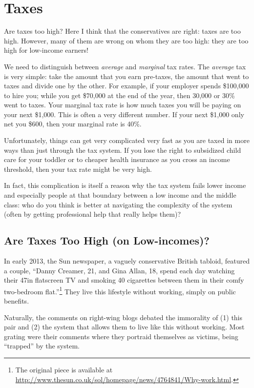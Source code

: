 \chapter{Taxes}%
\label{chpt:taxes}

Are taxes too high? Here I think that the conservatives are right: taxes are
too high. However, many of them are wrong on whom they are too high: they are
too high for low-income earners!

We need to distinguish between \emph{average} and \emph{marginal} tax rates.
The \emph{average} tax is very simple: take the amount that you earn pre-taxes,
the amount that went to taxes and divide one by the other. For example, if your
employer spends \$100,000 to hire you; while you get \$70,000 at the end of the
year, then 30,000 or 30\% went to taxes. Your marginal tax rate is how much
taxes you will be paying on your next \$1,000. This is often a very different
number. If your next \$1,000 only net you \$600, then your marginal rate is
40\%. %

Unfortunately, things can get very complicated very fast as you are taxed in
more ways than just through the tax system. If you lose the right to subsidized
child care for your toddler or to cheaper health insurance as you cross an
income threshold, then your tax rate might be very high.

In fact, this complication is itself a reason why the tax system fails lower
income and especially people at that boundary between a low income and the
middle class: who do you think is better at navigating the complexity of the
system (often by getting professional help that really helps them)?

\section{Are Taxes Too High (on Low-incomes)?}

In early 2013, the Sun newspaper, a vaguely conservative British tabloid,
featured a couple, ``Danny Creamer, 21, and Gina Allan, 18, spend each day
watching their 47in flatscreen TV and smoking 40 cigarettes between them in
their comfy two-bedroom flat.''\footnote{The original piece is available at
\url{http://www.thesun.co.uk/sol/homepage/news/4764841/Why-work.html}.} They
live this lifestyle without working, simply on public benefits.

Naturally, the comments on right-wing blogs debated the immorality of (1) this
pair and (2) the system that allows them to live like this without working.
Most grating were their comments where they portraid themselves as victims,
being ``trapped'' by the system.

